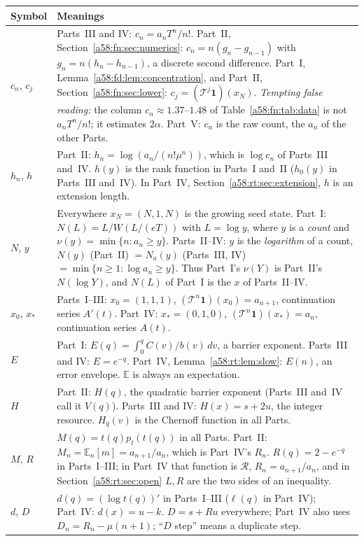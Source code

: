 \documentclass[11pt,letterpaper]{article}
\theoremstyle{remark}
\newcommand{\TT}{\mathcal T}
\newcommand{\one}{\mathbf 1}
\newcommand{\E}{\mathbb E}
\begin{document}
\begin{center}
\small
\begin{tabular}{@{}>{\raggedright\arraybackslash}p{} >{\raggedright\arraybackslash}p{}@{}}
\toprule
Symbol & Meanings\\
\midrule
$c_n$, $c_j$ & Parts~III and IV: $c_n=a_nT^n/n!$. Part~II, Section~\ref{a58:fn:sec:numerics}: $c_n=n(g_n-g_{n-1})$ with $g_n=n(h_n-h_{n-1})$, a discrete second difference. Part~I, Lemma~\ref{a58:fd:lem:concentration}, and Part~II, Section~\ref{a58:fn:sec:lower}: $c_j=(\TT^j\one)(x_N)$. \emph{Tempting false reading:} the column $c_n\approx1.37$--$1.48$ of Table~\ref{a58:fn:tab:data} is not $a_nT^n/n!$; it estimates $2\alpha$. Part~V: $c_n$ is the raw count, the $a_n$ of the other Parts.\\
$h_n$, $h$ & Part~II: $h_n=\log(a_n/(n!\mu^n))$, which is $\log c_n$ of Parts~III and~IV. $h(y)$ is the rank function in Parts~I and~II ($h_0(y)$ in Parts~III and~IV). In Part~IV, Section~\ref{a58:rt:sec:extension}, $h$ is an extension length.\\
$N$, $y$ & Everywhere $x_N=(N,1,N)$ is the growing seed state. Part~I: $N(L)=L/W(L/(eT))$ with $L=\log y$, where $y$ is a \emph{count} and $\nu(y)=\min\{n:a_n\ge y\}$. Parts~II--IV: $y$ is the \emph{logarithm} of a count, $N(y)$ (Part~II) $=N_a(y)$ (Parts~III, IV) $=\min\{n\ge1:\log a_n\ge y\}$. Thus Part~I's $\nu(Y)$ is Part~II's $N(\log Y)$, and $N(L)$ of Part~I is the $x$ of Parts~II--IV.\\
$x_0$, $x_*$ & Parts~I--III: $x_0=(1,1,1)$, $(\TT^n\one)(x_0)=a_{n+1}$, continuation series $A'(t)$. Part~IV: $x_*=(0,1,0)$, $(\TT^n\one)(x_*)=a_n$, continuation series $A(t)$.\\
$E$ & Part~I: $E(q)=\int_0^qC(v)/b(v)\,dv$, a barrier exponent. Parts~III and IV: $E=e^{-q}$. Part~IV, Lemma~\ref{a58:rt:lem:slow}: $E(n)$, an error envelope. $\E$ is always an expectation.\\
$H$ & Part~II: $H(q)$, the quadratic barrier exponent (Parts~III and~IV call it $V(q)$). Parts~III and IV: $H(x)=s+2u$, the integer resource. $H_q(v)$ is the Chernoff function in all Parts.\\
$M$, $R$ & $M(q)=t(q)p_t(t(q))$ in all Parts. Part~II: $M_n=\E_n[m]=a_{n+1}/a_n$, which is Part~IV's $R_n$. $R(q)=2-e^{-q}$ in Parts~I--III; in Part~IV that function is $\mathcal R$, $R_n=a_{n+1}/a_n$, and in Section~\ref{a58:rt:sec:open} $L,R$ are the two sides of an inequality.\\
$d$, $D$ & $d(q)=(\log t(q))'$ in Parts~I--III ($\ell(q)$ in Part~IV); Part~IV: $d(x)=u-k$. $D=s+Ru$ everywhere; Part~IV also uses $D_n=R_n-\mu(n+1)$; ``$D$ step'' means a duplicate step.\\

\end{tabular}
\end{center}
\end{document}
